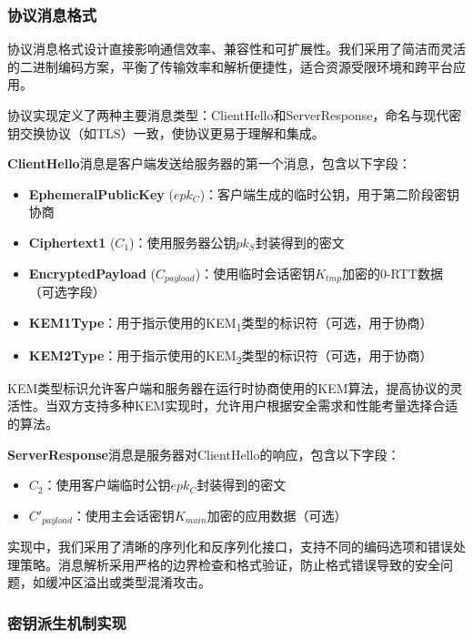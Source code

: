 \subsubsection{协议消息格式}
\label{subsubsec:message_format}
协议消息格式设计直接影响通信效率、兼容性和可扩展性。我们采用了简洁而灵活的二进制编码方案，平衡了传输效率和解析便捷性，适合资源受限环境和跨平台应用。

协议实现定义了两种主要消息类型：ClientHello和ServerResponse，命名与现代密钥交换协议（如TLS）一致，使协议更易于理解和集成。


\textbf{ClientHello}消息是客户端发送给服务器的第一个消息，包含以下字段：
\begin{itemize}
  \item \textbf{EphemeralPublicKey} ($epk_C$)：客户端生成的临时公钥，用于第二阶段密钥协商
  \item \textbf{Ciphertext1} ($C_1$)：使用服务器公钥$pk_S$封装得到的密文
  \item \textbf{EncryptedPayload} ($C_{payload}$)：使用临时会话密钥$K_{tmp}$加密的0-RTT数据（可选字段）
  \item \textbf{KEM1Type}：用于指示使用的KEM\textsubscript{1}类型的标识符（可选，用于协商）
  \item \textbf{KEM2Type}：用于指示使用的KEM\textsubscript{2}类型的标识符（可选，用于协商）
\end{itemize}

KEM类型标识允许客户端和服务器在运行时协商使用的KEM算法，提高协议的灵活性。当双方支持多种KEM实现时，允许用户根据安全需求和性能考量选择合适的算法。

\textbf{ServerResponse}消息是服务器对ClientHello的响应，包含以下字段：

\begin{itemize}
    \item $C_2$：使用客户端临时公钥$epk_C$封装得到的密文
    \item $C'_{payload}$：使用主会话密钥$K_{main}$加密的应用数据（可选）
\end{itemize}

实现中，我们采用了清晰的序列化和反序列化接口，支持不同的编码选项和错误处理策略。消息解析采用严格的边界检查和格式验证，防止格式错误导致的安全问题，如缓冲区溢出或类型混淆攻击。

\subsubsection{密钥派生机制实现}
\label{subsubsec:key_derivation_impl}


